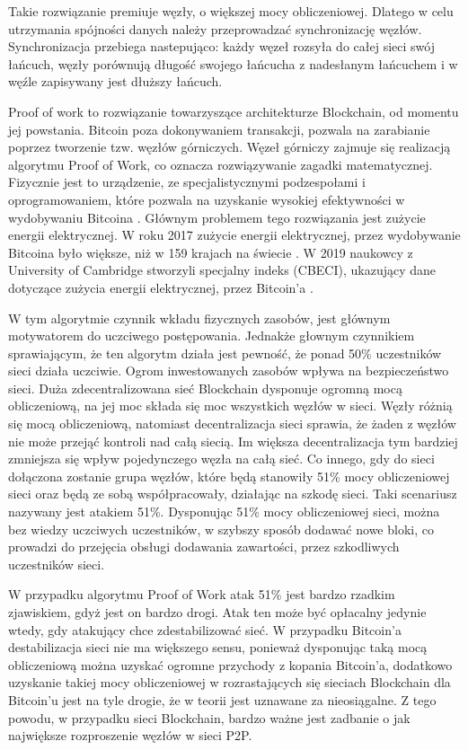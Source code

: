 \documentclass[a4paper,12pt]{book}
\begin{document}
Takie rozwiązanie premiuje węzły, o większej mocy obliczeniowej. Dlatego w celu utrzymania spójności danych należy przeprowadzać synchronizację węzłów. Synchronizacja przebiega nastepująco: każdy węzeł rozsyła do całej sieci swój łańcuch, węzły porównują długość swojego łańcucha z nadesłanym łańcuchem i w węźle zapisywany jest dłuższy łańcuch.

Proof of work to rozwiązanie towarzyszące architekturze Blockchain, od momentu jej powstania. Bitcoin poza dokonywaniem transakcji, pozwala na zarabianie poprzez tworzenie tzw. węzłów górniczych. Węzeł górniczy zajmuje się realizacją algorytmu Proof of Work, co oznacza rozwiązywanie zagadki matematycznej. Fizycznie jest to urządzenie, ze specjalistycznymi podzespołami i oprogramowaniem, które pozwala na uzyskanie wysokiej efektywności w wydobywaniu Bitcoina \cite{nodes}. Głównym problemem tego rozwiązania jest zużycie energii elektrycznej. W roku 2017 zużycie energii elektrycznej, przez wydobywanie Bitcoina było większe, niż w 159 krajach na świecie \cite{elctricity-bitcoin}. W 2019 naukowcy z University of Cambridge stworzyli specjalny indeks (CBECI), ukazujący dane dotyczące zużycia energii elektrycznej, przez Bitcoin'a \cite{CBECI}.

W tym algorytmie czynnik wkładu fizycznych zasobów, jest głównym motywatorem do uczciwego postępowania. Jednakże głownym czynnikiem sprawiającym, że ten algorytm działa jest pewność, że ponad 50\% uczestników sieci działa uczciwie. Ogrom inwestowanych zasobów wpływa na bezpieczeństwo sieci. Duża zdecentralizowana sieć Blockchain dysponuje ogromną mocą obliczeniową, na jej moc składa się moc wszystkich węzłów w sieci. Węzły różnią się mocą obliczeniową, natomiast decentralizacja sieci sprawia, że żaden z węzłów nie może przejąć kontroli nad całą siecią. Im większa decentralizacja tym bardziej zmniejsza się wpływ pojedynczego węzła na całą sieć. Co innego, gdy do sieci dołączona zostanie grupa węzłów, które będą stanowiły 51\% mocy obliczeniowej sieci oraz będą ze sobą współpracowały, działając na szkodę sieci. Taki scenariusz nazywany jest atakiem 51\%. Dysponując 51\% mocy obliczeniowej sieci, można bez wiedzy uczciwych uczestników, w szybszy sposób dodawać nowe bloki, co prowadzi do przejęcia obsługi dodawania zawartości, przez szkodliwych uczestników siec\cite{atack51}i.

W przypadku algorytmu Proof of Work atak 51\% jest bardzo rzadkim zjawiskiem, gdyż jest on bardzo drogi. Atak ten może być opłacalny jedynie wtedy, gdy atakujący chce zdestabilizować sieć. W przypadku Bitcoin'a destabilizacja sieci nie ma większego sensu, ponieważ dysponując taką mocą obliczeniową można uzyskać ogromne przychody z kopania Bitcoin'a, dodatkowo uzyskanie takiej mocy obliczeniowej w rozrastających się sieciach Blockchain dla Bitcoin'u jest na tyle drogie, że w teorii jest uznawane za nieosiągalne. Z tego powodu, w przypadku sieci Blockchain, bardzo ważne jest zadbanie o jak największe rozproszenie węzłów w sieci P2P.
\end{document}

